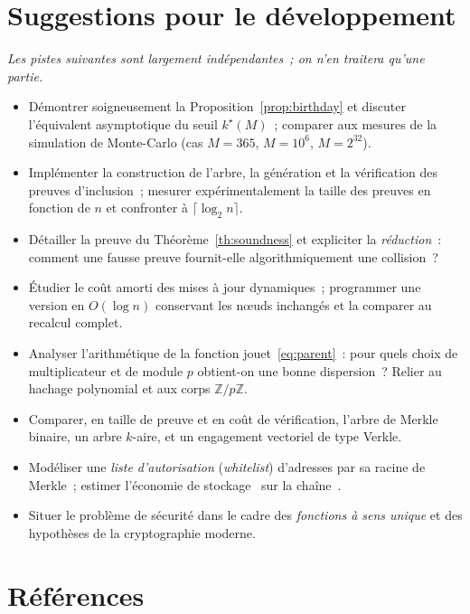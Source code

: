 \documentclass[11pt,a4paper]{article}
\theoremstyle{definition}\newtheorem{definition}{Définition}
\theoremstyle{plain}\newtheorem{theoreme}{Théorème}\newtheorem{proposition}{Proposition}\newtheorem{lemme}{Lemme}
\theoremstyle{remark}\newtheorem{remarque}{Remarque}
\begin{document}
\section*{Suggestions pour le développement}

\emph{Les pistes suivantes sont largement indépendantes~; on n'en traitera qu'une partie.}

\begin{itemize}[nosep,leftmargin=1.3em]
  \item Démontrer soigneusement la Proposition~\ref{prop:birthday} et discuter l'équivalent
        asymptotique du seuil $k^\star(M)$~; comparer aux mesures de la simulation de Monte-Carlo
        (cas $M=365$, $M=10^6$, $M=2^{32}$).
  \item Implémenter la construction de l'arbre, la génération et la vérification des preuves
        d'inclusion~; mesurer expérimentalement la taille des preuves en fonction de $n$ et
        confronter à $\lceil\log_2 n\rceil$.
  \item Détailler la preuve du Théorème~\ref{th:soundness} et expliciter la
        \emph{réduction}~: comment une fausse preuve fournit-elle algorithmiquement une collision~?
  \item Étudier le coût amorti des mises à jour dynamiques~; programmer une version en
        $O(\log n)$ conservant les n\oe uds inchangés et la comparer au recalcul complet.
  \item Analyser l'arithmétique de la fonction jouet~\eqref{eq:parent}~: pour quels choix de
        multiplicateur et de module $p$ obtient-on une bonne dispersion~? Relier au hachage
        polynomial et aux corps $\mathbb{Z}/p\mathbb{Z}$.
  \item Comparer, en taille de preuve et en coût de vérification, l'arbre de Merkle binaire, un
        arbre $k$-aire, et un engagement vectoriel de type Verkle.
  \item Modéliser une \emph{liste d'autorisation} (\emph{whitelist}) d'adresses par sa racine de
        Merkle~; estimer l'économie de stockage \guillemotleft~sur la chaîne~\guillemotright.
  \item Situer le problème de sécurité dans le cadre des \emph{fonctions à sens unique} et des
        hypothèses de la cryptographie moderne.
\end{itemize}

\section*{Références}
\end{document}
